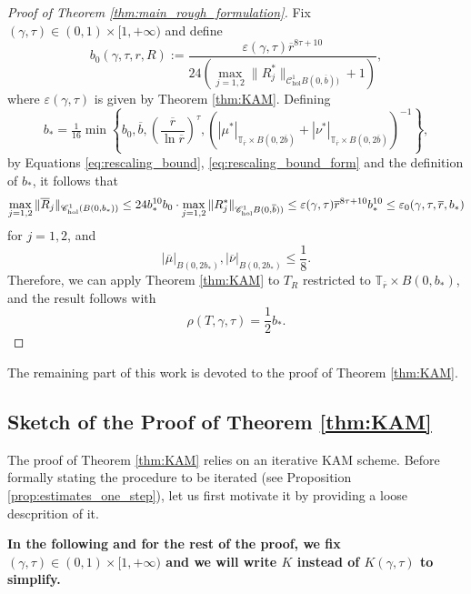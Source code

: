 \documentclass[10pt]{article}
\newcommand{\T}{\mathbb{T}}
\begin{document}
\begin{proof}[Proof of Theorem \ref{thm:main_rough_formulation}]
Fix $(\gamma,\tau)\in(0,1)\times[1,+\infty)$ and define 
\[ 
b_0(\gamma, \tau, r, R):= 
\frac{\varepsilon(\gamma,\tau)\overline{r}^{8\tau + 10}}
{24\left(\max_{j=1,2}\| R_j^\ast \|_{\mathscr C^1_{\text{hol}}B(0, \overline{b}))}+1\right)},
\]
where $\varepsilon(\gamma,\tau)$ is given by Theorem \ref{thm:KAM}. Defining
\[b_{\ast} = 
\tfrac{1}{16}
\min\left\{
b_0,\overline{b}, 
\left(\frac{\overline r}{\ln \overline r}\right)^\tau,
( | \mu^*|_{\T_{\overline r}\times B(0,2\overline b)} + | \nu^*|_{\T_{\overline r}\times B(0,2\overline b)})^{-1} 
\right\},\]
by Equations \eqref{eq:rescaling_bound}, \eqref{eq:rescaling_bound_form} and the definition of $b_*$, it follows that
\[
\max_{j=1,2} \|\overline R_j\|_{\mathscr{C}^1_{\textup{hol}}(B(0, b_{\ast}))}\leq 
24b_\ast^{10}b_0\cdot \max_{j=1,2}\| R_j^\ast \|_{\mathscr C^1_{\text{hol}}B(0, \overline{b}))}
\leq 
\varepsilon(\gamma,\tau) \overline{r}^{8\tau + 10}b_*^{10}\leq\varepsilon_0(\gamma,\tau,\overline r,b_\ast)
\]
for $j=1,2$, and
\[
| \overline \mu|_{B(0,2b_*)}, | \overline \nu|_{B(0,2b_*)} \leq \frac{1}{8}.
\]
Therefore, we can apply Theorem \ref{thm:KAM} to $T_R$ restricted to $\T_{\overline{r}} \times B(0, b_*)$, and the result follows with
\begin{equation}
    \label{eq:formula_rho}
    \rho(T, \gamma, \tau) = \frac{1}{2}b_\ast.
\end{equation} 
\end{proof}

The remaining part of this work is devoted to the proof of Theorem \ref{thm:KAM}.



\subsection{Sketch of the Proof of Theorem \ref{thm:KAM}}  
\label{subsec:sketch}


The proof of Theorem \ref{thm:KAM} relies on an iterative KAM scheme. Before formally stating the procedure to be iterated (see Proposition \ref{prop:estimates_one_step}), let us first motivate it by providing a loose descprition of it.
\vspace{0.2cm}

\noindent \textbf{In the following and for the rest of the proof, we fix $(\gamma,\tau)\in (0,1)\times [1,+\infty)$ and we will write $K$ instead of $K(\gamma, \tau)$ to simplify.}
\vspace{0.2cm}
\end{document}

